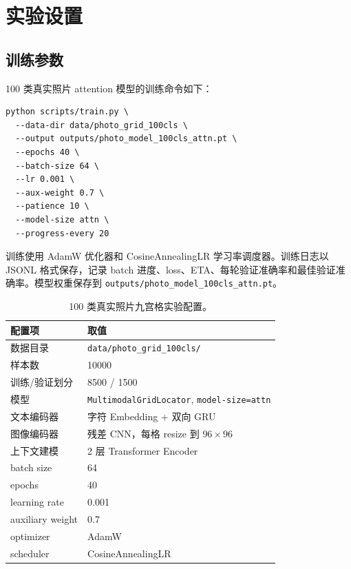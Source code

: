 \documentclass[UTF8,a4paper,12pt,fontset=fandol]{ctexart}
\newcommand{\code}[1]{\texttt{#1}}
\begin{document}
\section{实验设置}

\subsection{训练参数}

100 类真实照片 attention 模型的训练命令如下：

\begin{verbatim}
python scripts/train.py \
  --data-dir data/photo_grid_100cls \
  --output outputs/photo_model_100cls_attn.pt \
  --epochs 40 \
  --batch-size 64 \
  --lr 0.001 \
  --aux-weight 0.7 \
  --patience 10 \
  --model-size attn \
  --progress-every 20
\end{verbatim}

训练使用 AdamW 优化器和 CosineAnnealingLR 学习率调度器。训练日志以 JSONL 格式保存，记录 batch 进度、loss、ETA、每轮验证准确率和最佳验证准确率。模型权重保存到 \code{outputs/photo\_model\_100cls\_attn.pt}。

\begin{table}[H]
  \centering
  \caption{100 类真实照片九宫格实验配置。}
  \label{tab:config}
  \begin{tabular}{ll}
    \toprule
    \rowcolor{tablehead}
    配置项 & 取值 \\
    \midrule
    数据目录 & \code{data/photo\_grid\_100cls/} \\
    样本数 & 10000 \\
    训练/验证划分 & 8500 / 1500 \\
    模型 & \code{MultimodalGridLocator}, \code{model-size=attn} \\
    文本编码器 & 字符 Embedding + 双向 GRU \\
    图像编码器 & 残差 CNN，每格 resize 到 $96\times96$ \\
    上下文建模 & 2 层 Transformer Encoder \\
    batch size & 64 \\
    epochs & 40 \\
    learning rate & 0.001 \\
    auxiliary weight & 0.7 \\
    optimizer & AdamW \\
    scheduler & CosineAnnealingLR \\
    \bottomrule
  \end{tabular}
\end{table}
\end{document}
